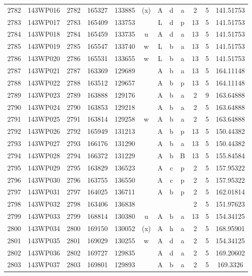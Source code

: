 \begin{tabular}{|*{12}{c|}}
2782 & 143WP016 & 2782 & 165327 & 133885 & (x) & A & d & a & 2 & 5 & 141.51753 \\ 
2783 & 143WP017 & 2783 & 165409 & 133753 &  & L & d & p & 13 & 5 & 141.51753 \\ 
2784 & 143WP018 & 2784 & 165459 & 133735 & u & A & d & a & 13 & 5 & 141.51753 \\ 
2785 & 143WP019 & 2785 & 165547 & 133740 & w & L & b & a & 13 & 5 & 141.51753 \\ 
2786 & 143WP020 & 2786 & 165531 & 133655 & w & L & b & a & 13 & 5 & 141.51753 \\ 
2787 & 143WP021 & 2787 & 163369 & 129689 &  & A & b & a & 13 & 5 & 164.11148 \\ 
2788 & 143WP022 & 2788 & 163512 & 129657 &  & A & b & p & 13 & 5 & 164.11148 \\ 
2789 & 143WP023 & 2789 & 163888 & 129176 &  & A & b & a & 2 & 9 & 163.64888 \\ 
2790 & 143WP024 & 2790 & 163853 & 129218 &  & A & b & a & 2 & 5 & 163.64888 \\ 
2791 & 143WP025 & 2791 & 163814 & 129258 & w & A & b & a & 2 & 5 & 163.64888 \\ 
2792 & 143WP026 & 2792 & 165949 & 131213 &  & A & b & p & 13 & 5 & 150.44382 \\ 
2793 & 143WP027 & 2793 & 166176 & 131290 &  & A & b & a & 13 & 5 & 150.44382 \\ 
2794 & 143WP028 & 2794 & 166372 & 131229 &  & A & b & B & 13 & 5 & 155.84584 \\ 
2795 & 143WP029 & 2795 & 163829 & 136523 &  & A & c & p & 2 & 5 & 157.95322 \\ 
2796 & 143WP030 & 2796 & 163755 & 136550 &  & A & c & p & 2 & 5 & 157.95322 \\ 
2797 & 143WP031 & 2797 & 164025 & 136711 &  & A & b & p & 2 & 5 & 162.01814 \\ 
2798 & 143WP032 & 2798 & 163406 & 136838 &  &  &  &  & 2 & 5 & 151.97623 \\ 
2799 & 143WP033 & 2799 & 168814 & 130380 & u & A & b & a & 13 & 5 & 154.34125 \\ 
2800 & 143WP034 & 2800 & 169150 & 130052 & (x) & A & h & a & 2 & 5 & 168.95901 \\ 
2801 & 143WP035 & 2801 & 169029 & 130255 & w & A & d & a & 2 & 5 & 154.34125 \\ 
2802 & 143WP036 & 2802 & 169727 & 129835 &  & A & d & a & 2 & 5 & 169.20602 \\ 
2803 & 143WP037 & 2803 & 169801 & 129893 &  & A & b & a & 2 & 5 & 169.3326 \\ 

\end{tabular}
